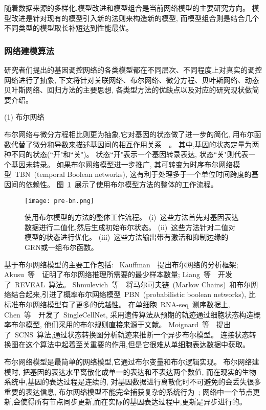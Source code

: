 随着数据来源的多样化,模型改进和模型组合是当前网络模型的主要研究方向。
模型改进是针对现有的模型引入新的法则来构造新的模型,
而模型组合则是结合几个不同类型的模型取长补短达到性能最优。

\subsubsection{网络建模算法}
研究者们提出的基因调控网络的各类模型都在不同层次、不同程度上对真实的调控网络进行了抽象,
下文将针对关联网络、布尔网络、微分方程、贝叶斯网络、动态贝叶斯网络、回归方法的主要思想,
各类型方法的优缺点以及对应的研究现状做简要介绍。

(1) 布尔网络

布尔网络与微分方程相比则更为抽象,它对基因的状态做了进一步的简化,
用布尔函数代替了微分和导数来描述基因间的相互作用关系~\cite{shmulevich2002probabilistic,kim2007boolean,bornholdt2008boolean,zhou2016relative}~。
其中,基因的状态定量为两种不同的状态(``开"和``关")。
状态``开"表示一个基因转录表达, 状态``关"则代表一个基因未转录。
如果布尔网络模型进一步推广, 其可转变为时序布尔网络模型~TBN~(temporal Boolean networks), 这有利于处理多于一个单位时间跨度的基因间的依赖性。
图~\ref{fig:pre-bn}~展示了使用布尔模型方法的整体的工作流程。
\begin{figure}[!htbp]
    \centering
    \texttt{[image: pre-bn.png]}
    \caption{
        使用布尔模型的方法的整体工作流程。
        (i)~这些方法首先对基因表达数据进行二值化,然后生成初始布尔状态。
        (ii)~这些方法针对二值对模型的状态进行优化。
        (iii)~这些方法输出带有激活和抑制边缘的GRN或一组布尔函数。
    }
    \label{fig:pre-bn}
\end{figure}

基于布尔网络模型的主要工作包括:
~Kauffman~\cite{kauffman2003random}~提出布尔网络的分析框架;
Akusu~等~\cite{akutsu1999identification}~证明了布尔网络推理所需要的最少样本数量;
Liang~等~\cite{liang1998reveal}~开发了~REVEAL~算法。
Shmulevich~等~\cite{marshall2007inference}~将马尔可夫链~(Markov Chains)~和布尔网络结合起来,引进了概率布尔网络模型~PBN~(probabilistic boolean networks),
比标准布尔网络模型有了更多的优越性。
在单细胞~RNA-seq~测序数据上,
Chen~等~\cite{chen2014single}~开发了~SingleCellNet,
采用遗传算法从预期的轨迹通过细胞状态构造概率布尔模型, 他们采用的布尔规则直接来源于文献。
Moignard~等~\cite{moignard2015decoding}~提出了~SCNS~算法,通过状态转换图分析轨迹来推断一个异步布尔模型。
连接状态转换图在这个算法中起着至关重要的作用,但是它很难从单细胞表达数据中获取。

布尔网络模型是最简单的网络模型,它通过布尔变量和布尔逻辑实现。
布尔网络建模时, 把基因的表达水平离散化成单一的表达和不表达两个数值,
而在现实的生物系统中,基因的表达过程是连续的,
对基因数据进行离散化时不可避免的会丢失很多重要的表达信息,
布尔网络模型不能完全捕获复杂的系统行为~\cite{lee2009computational};
网络中一个节点更新,会使得所有节点同步更新,而在实际的基因表达过程中,更新是异步进行的。

